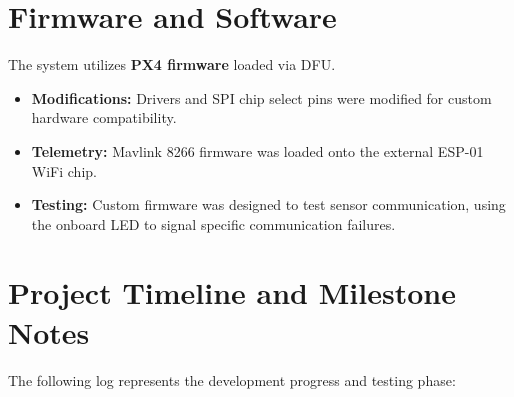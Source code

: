 \documentclass[12pt,a4paper]{article}
\begin{document}

\section{Firmware and Software}
The system utilizes \textbf{PX4 firmware} loaded via DFU.
\begin{itemize}
    \item \textbf{Modifications:} Drivers and SPI chip select pins were modified for custom hardware compatibility.
    \item \textbf{Telemetry:} Mavlink 8266 firmware was loaded onto the external ESP-01 WiFi chip.
    \item \textbf{Testing:} Custom firmware was designed to test sensor communication, using the onboard LED to signal specific communication failures.
\end{itemize}

\section{Project Timeline and Milestone Notes}
The following log represents the development progress and testing phase:
\end{document}

